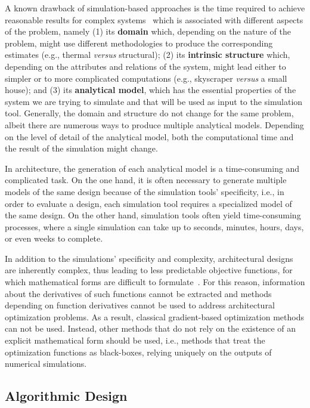 	A known drawback of simulation-based approaches is the time required to achieve reasonable results for complex systems~\cite{Law1991} which is associated with different aspects of the problem, namely (1) its \textbf{domain} which, depending on the nature of the problem, might use different methodologies to produce the corresponding estimates (e.g., thermal \textit{versus} structural); (2) its \textbf{intrinsic structure} which, depending on the attributes and relations of the system, might lead either to simpler or to more complicated computations (e.g., skyscraper \textit{versus} a small house); and (3) its \textbf{analytical model}, which has the essential properties of the system we are trying to simulate and that will be used as input to the simulation tool. Generally, the domain and structure do not change for the same problem, albeit there are numerous ways to produce multiple analytical models. Depending on the level of detail of the analytical model, both the computational time and the result of the simulation might change. 

	In architecture, the generation of each analytical model is a time-consuming and complicated task. On the one hand, it is often necessary to generate multiple models of the same design because of the simulation tools' specificity, i.e., in order to evaluate a design, each simulation tool requires a specialized model of the same design. On the other hand, simulation tools often yield time-consuming processes, where a single simulation can take up to seconds, minutes, hours, days, or even weeks to complete. 
	
	In addition to the simulations' specificity and complexity, architectural designs are inherently complex, thus leading to less predictable objective functions, for which mathematical forms are difficult to formulate~\cite{Machairas2014}. For this reason, information about the derivatives of such functions cannot be extracted and methods depending on function derivatives cannot be used to address architectural optimization problems. As a result, classical gradient-based optimization methods can not be used. Instead, other methods that do not rely on the existence of an explicit mathematical form should be used, i.e., methods that treat the optimization functions as black-boxes, relying uniquely on the outputs of numerical simulations.
	

\subsection{Algorithmic Design}


